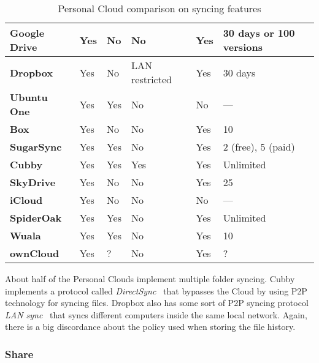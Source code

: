 {{\begin{table}
\begin{center}
\begin{tabular}{ | p{3.3cm} | p{1.4cm} | p{1.4cm} | p{2.4cm} | p{1.4cm} | p{2.9cm} | }
	\textbf{Google Drive} &
	Yes &
	No &
	No &
	Yes &
	30 days or 100 versions \\ \hline

	\textbf{Dropbox} &
	Yes &
	No &
	LAN restricted &
	Yes &
	30 days \\ \hline
	
	\textbf{Ubuntu One} &
	Yes &
	Yes &
	No &
	No &
	--- \\ \hline
	
	\textbf{Box} &
	Yes &
	No & 
	No &
	Yes &
	10 \\ \hline
	
	\textbf{SugarSync} & 
	Yes &
	Yes &
	No &
	Yes &
	2 (free), 5 (paid) \\ \hline
	
	\textbf{Cubby} &
	Yes &
	Yes &
	Yes &
	Yes &
	Unlimited \\ \hline
	
	\textbf{SkyDrive} & 
	Yes &
	No &
	No &
	Yes &
	25 \\ \hline

	\textbf{iCloud} &
	Yes &
	No &
	No &
	No &
	--- \\ \hline
	
	\textbf{SpiderOak} & 
	Yes &
	Yes &
	No &
	Yes &
	Unlimited \\ \hline

	\textbf{Wuala} &
	Yes &
	Yes &
	No &
	Yes &
	10 \\ \hline
	
	\textbf{ownCloud} &
	Yes &
	? &
	No &
	Yes &
	? \\ \hline

    \end{tabular}
    \caption{Personal Cloud comparison on syncing features}
    \label{tab:pc_syncing}
\end{center}
\end{table}
}

About half of the Personal Clouds implement multiple folder syncing. Cubby implements a protocol called \textit{DirectSync}~\cite{directsync} that bypasses the Cloud by using P2P technology for syncing files. Dropbox also has some sort of P2P syncing protocol \textit{LAN sync}~\cite{lansync} that syncs different computers inside the same local network. Again, there is a big discordance about the policy used when storing the file history.




\subsubsection{Share}


}
